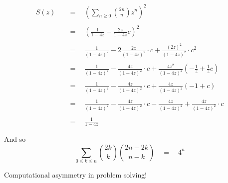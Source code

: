 \documentclass[twoside]{article}
\newcommand{\equals}{\ensuremath{\quad =\quad}}
\newcommand{\cat}{\ensuremath{c}}
\begin{document}
\begin{align*}
S(z)			& \equals \left(\sum_{n\ge 0}{2n \choose n}z^n\right)^2							\\
																\\
			& \equals \left(\frac{1}{1-4z}-\frac{2z}{1-4z}\cat\right)^2						\\
																\\
			& \equals \frac{1}{(1-4z)^2}-2\frac{2z}{(1-4z)^2} \cdot \cat+\frac{(2z)^2}{(1-4z)^2} \cdot \cat^2	\\
																\\
			& \equals \frac{1}{(1-4z)^2}-\frac{4z}{(1-4z)^2} \cdot \cat
				  +\frac{4z^2}{(1-4z)^2}\left(-\frac{1}{z}+\frac{1}{z}\cat\right)				\\
																\\
			& \equals \frac{1}{(1-4z)^2}-\frac{4z}{(1-4z)^2} \cdot \cat+\frac{4z}{(1-4z)^2}(-1+\cat)		\\
																\\
			& \equals \frac{1}{(1-4z)^2}-\frac{4z}{(1-4z)^2} \cdot \cat
				  -\frac{4z}{(1-4z)^2}+\frac{4z}{(1-4z)^2} \cdot \cat						\\
																\\
			& \equals \frac{1}{1-4z}
\end{align*}

And so
$$ \sum_{0\le k\le n}{2k \choose k}{2n-2k \choose n-k} \equals 4^n $$

Computational asymmetry in problem solving!
\end{document}
